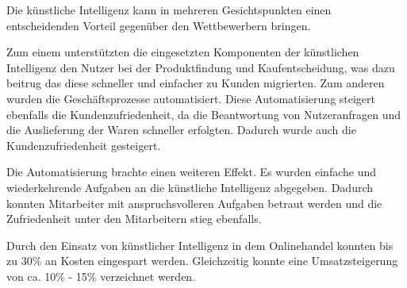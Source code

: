 Die künstliche Intelligenz kann in mehreren Gesichtspunkten einen entscheidenden Vorteil gegenüber den Wettbewerbern bringen.\vspace{0.2cm}

Zum einem unterstützten die eingesetzten Komponenten der künstlichen Intelligenz den Nutzer bei der Produktfindung und Kaufentscheidung, was dazu beitrug das diese schneller und einfacher zu Kunden migrierten. Zum anderen wurden die Geschäftsprozesse automatisiert. Diese Automatisierung steigert ebenfalls die Kundenzufriedenheit, da die Beantwortung von Nutzeranfragen und die Auslieferung der Waren schneller erfolgten. Dadurch wurde auch die Kundenzufriedenheit gesteigert.\vspace{0.2cm}

Die Automatisierung brachte einen weiteren Effekt. Es wurden einfache und wiederkehrende Aufgaben an die künstliche Intelligenz abgegeben. Dadurch konnten Mitarbeiter mit anspruchsvolleren Aufgaben betraut werden und die Zufriedenheit unter den Mitarbeitern stieg ebenfalls.\vspace{0.2cm}

Durch den Einsatz von künstlicher Intelligenz in dem Onlinehandel konnten bis zu 30\% an Kosten eingespart werden. Gleichzeitig konnte eine Umsatzsteigerung von ca. 10\% - 15\% verzeichnet werden.
